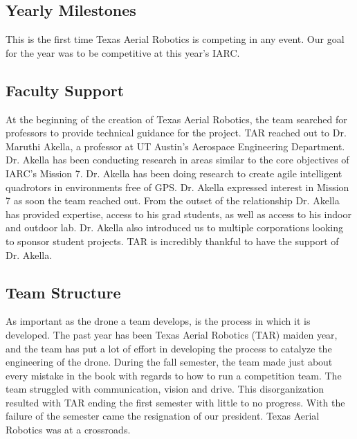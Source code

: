 \documentclass[12pt]{article}
\begin{document}
\subsection{Yearly Milestones}
This is the first time Texas Aerial Robotics is competing in any event. Our goal for the year was to be competitive at this year's IARC. %

\subsection{Faculty Support}
At the beginning of the creation of Texas Aerial Robotics, the team searched for professors to provide technical guidance for the project. TAR reached out to Dr. Maruthi Akella, a professor at UT Austin's Aerospace Engineering Department. Dr. Akella has been conducting research in areas similar to the core objectives of IARC’s Mission 7. Dr. Akella has been doing research to create agile intelligent quadrotors in environments free of GPS. Dr. Akella expressed interest in Mission 7 as soon the team reached out. From the outset of the relationship Dr. Akella has provided expertise, access to his grad students, as well as access to his indoor and outdoor lab. Dr. Akella also introduced us to multiple corporations looking to sponsor student projects. TAR is incredibly thankful to have the support of Dr. Akella. 

\subsection{Team Structure}
As important as the drone a team develops, is the process in which it is developed. The past year has been Texas Aerial Robotics (TAR) maiden year, and the team has put a lot of effort in developing the process to catalyze the engineering of the drone. During the fall semester, the team made just about every mistake in the book with regards to how to run a competition team. The team struggled with communication, vision and drive. This disorganization resulted with TAR ending the first semester with little to no progress. With the failure of the semester came the resignation of our president. Texas Aerial Robotics was at a crossroads. 
\end{document}
